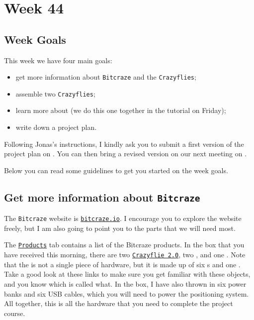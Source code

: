 \chapter*{Week 44}


\section*{Week Goals}

This week we have four main goals:
\begin{itemize}
\item get more information about \texttt{Bitcraze} and the \texttt{Crazyflies};
\item assemble two \texttt{Crazyflies};
\item learn more about \ROS{} (we do this one together in the tutorial on Friday);
\item write down a project plan.
\end{itemize}

Following Jonas's instructions, I kindly ask you to submit a first version of the project plan on .
You can then bring a revised version on our next meeting on .

Below you can read some guidelines to get you started on the week goals.



\section*{Get more information about \texttt{Bitcraze}}

The \texttt{Bitcraze} website is \href{https://bitcraze.io}{\texttt{bitcraze.io}}.
I encourage you to explore the website freely, but I am also going to point you to the parts that we will need most.

The \href{}{\texttt{Products}} tab contains a list of the Bitcraze products.
In the box that you have received this morning, there are two \href{https://www.bitcraze.io/crazyflie-2/}{\texttt{Crazyflie 2.0}}, two \href{https://www.bitcraze.io/crazyradio-pa/}{\CRPA{}}, and one \href{https://www.bitcraze.io/loco-pos-system/}{\LPS{}}.
Note that the \href{}{\LPS{}} is not a single piece of hardware, but it is made up of six \href{https://www.bitcraze.io/loco-pos-deck/}{\LPN{}}s and one \href{https://www.bitcraze.io/loco-pos-deck/}{\LPD{}}.
Take a good look at these links to make sure you get familiar with these objects, and you know which is called what.
In the box, I have also thrown in six power banks and six USB cables, which you will need to power the positioning system.
All together, this is all the hardware that you need to complete the project course.

